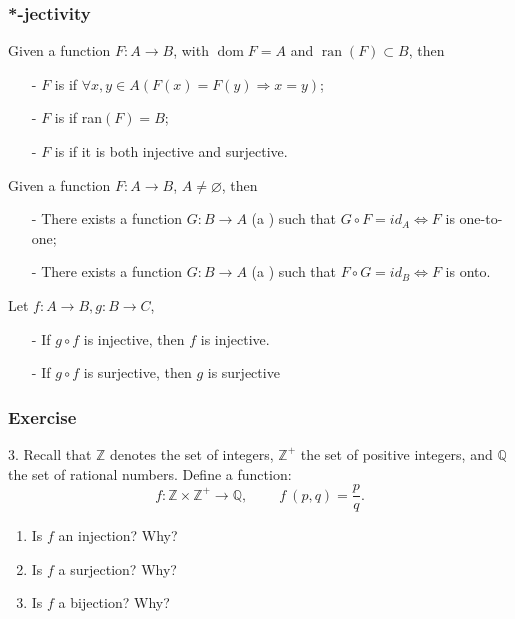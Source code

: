 \documentclass{beamer}
\begin{document}
\begin{frame}
    \frametitle{*-jectivity}
    \parbox{\textwidth}{
		\par Given a function $F : A \to B$, with $\operatorname{dom} F = A$ and $ \operatorname{ran}(F) \subset B$, then
		\begin{itemize}
			\item[-] $F$ is  if $\forall x, y \in A(F(x) = F(y) \Rightarrow x = y)$;
			\item[-] $F$ is  if ran$(F) = B$;
			\item[-] $F$ is  if it is both injective and surjective.
		\end{itemize}
		\vs{0.3em}
		\par Given a function $F : A \to B$, $A \neq \varnothing$, then
		\begin{itemize}
			\item[-] There exists a function $G : B \to A$ (a ) such that
			$G \circ F = id_A \Leftrightarrow F$ is one-to-one;
			\item[-] There exists a function $G : B \to A$ (a ) such that
			$F \circ G = id_B \Leftrightarrow F$ is onto.
		\end{itemize}
        \begin{block}{Let $f : A \to B, g : B \to C$,}
            \begin{itemize}
                \item[-] If $g \circ f$ is injective, then $f$ is injective.
                \item[-] If $g \circ f$ is surjective, then $g$ is surjective
            \end{itemize}
        \end{block}
	}
\end{frame}
\begin{frame}
    \frametitle{Exercise}
    3. Recall that $\mathbb{Z}$ denotes the set of integers, $\mathbb{Z}^+$ the set of positive integers, and $\mathbb{Q}$ the set of rational numbers. 
    Define a function: 
    \begin{equation*}
    f: \mathbb{Z} \times \mathbb{Z}^+ \to \mathbb{Q},~~~~~~~~~~
    f~(p,q) = \frac{p}{q}.
    \end{equation*}
    \begin{enumerate}
    	\item Is $f$ an injection? Why?
    	\item Is $f$ a surjection? Why?
    	\item Is $f$ a bijection? Why?
    \end{enumerate}
\end{frame}
\end{document}

